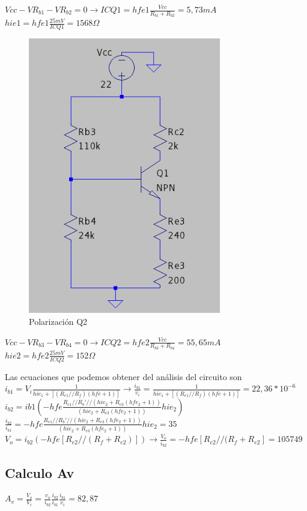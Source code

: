 \documentclass[12pt, letterpaper]{article}
\begin{document}
$Vcc-VR_{b1}-VR_{b2}=0 \rightarrow ICQ1=hfe1\frac{Vcc}{R_{b1}+R_{b2}}=5,73mA$
\singlespacing
$hie1=hfe1\frac{25mV}{ICQ1}=1568\Omega$
\begin{figure}[H]
	\centering
	\includegraphics[width=0.75\textwidth]{Imagenes/PolarizaQ2.png}
	\caption{Polarización Q2}
	\label{fig:pol_Q2}
\end{figure}
$Vcc-VR_{b3}-VR_{b4}=0 \rightarrow ICQ2=hfe2\frac{Vcc}{R_{b3}+R_{b4}}=55,65mA$
\singlespacing
$hie2=hfe2\frac{25mV}{ICQ2}=152\Omega$
\singlespacing

Las ecuaciones que podemos obtener del análisis del circuito son
\singlespacing
$i_{b1}=V_i\frac{1}{hie_1+[(R_{e1}//R_f)(hfe + 1)]} \rightarrow \frac{i_{b1}}{v_i}=\frac{1}{hie_1+[(R_{e1}//R_f)(hfe + 1)]}=22,36*10^{-6}$
\singlespacing
$ i_{b2}=ib1(-hfe\frac{R_{e1}//R_b'//(hie_2+R_{e3}(hfe_2+1))}{(hie_2+R_{e3}(hfe_2+1))}{hie_2}) $
\singlespacing
$ \frac{i_{b2}}{i_{b1}}=-hfe\frac{R_{e1}//R_b'//(hie_2+R_{e3}(hfe_2+1))}{(hie_2+R_{e3}(hfe_2+1))}{hie_2}=35$
\singlespacing
$V_o=i_{b2}(-hfe[R_{e2}//(R_f+R_{e2})]) \rightarrow \frac{V_o}{i_{b2}}=-hfe[R_{e2}//(R_f+R_{e2}]=105749$
\subsection{Calculo Av}
$A_v=\frac{V_o}{V_i}=\frac{v_o}{i_{b2}}\frac{i_{b2}}{i_{b1}}\frac{i_{b1}}{v_i}=82,87$
\end{document}
